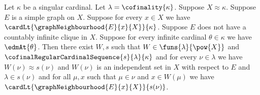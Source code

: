 \begin{theorem}\label{singular_selected_block_family}
    Let $\kappa$ be a singular cardinal.
    Let $\lambda=\cofinality{\kappa}$.
    Suppose $X\approx\kappa$.
    Suppose $E$ is a simple graph on $X$.
    Suppose for every $x\in X$ we have
        $\cardLt{\graphNeighbourhood{E}{x}{X}}{\kappa}$.
    Suppose $E$ does not have a countably infinite clique in $X$.
    Suppose for every infinite cardinal $\theta\in\kappa$ we have $\edmAt{\theta}$.
    Then there exist $W,s$ such that
        $W\in\funs{\lambda}{\pow{X}}$ and
        $\cofinalRegularCardinalSequence{s}{\lambda}{\kappa}$ and
        for every $\nu\in\lambda$ we have
            $W(\nu)\approx s(\nu)$ and
            $W(\nu)$ is an independent set in $X$ with respect to $E$ and
            $\lambda\in s(\nu)$ and
            for all $\mu,x$ such that $\mu\in\nu$ and $x\in W(\mu)$ we have
                $\cardLt{\graphNeighbourhood{E}{x}{X}}{s(\nu)}$.
\end{theorem}
